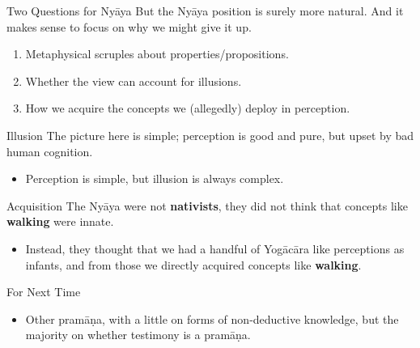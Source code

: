\documentclass[
  17pt,
  letterpaper,
  ignorenonframetext,
  aspectratio=169,
]{beamer}
\providecommand{\tightlist}{%
  \setlength{\itemsep}{0pt}\setlength{\parskip}{0pt}}\usepackage{longtable,booktabs,array}
\begin{document}
\begin{frame}{Two Questions for Nyāya}
\protect\hypertarget{two-questions-for-nyux101ya}{}
But the Nyāya position is surely more natural. And it makes sense to
focus on why we might give it up.

\begin{enumerate}[<+->]
\tightlist
\item
  Metaphysical scruples about properties/propositions.
\item
  Whether the view can account for illusions.
\item
  How we acquire the concepts we (allegedly) deploy in perception.
\end{enumerate}
\end{frame}

\begin{frame}{Illusion}
\protect\hypertarget{illusion}{}
The picture here is simple; perception is good and pure, but upset by
bad human cognition.

\begin{itemize}[<+->]
\tightlist
\item
  Perception is simple, but illusion is always complex.
\end{itemize}
\end{frame}

\begin{frame}{Acquisition}
\protect\hypertarget{acquisition}{}
The Nyāya were not \textbf{nativists}, they did not think that concepts
like \textbf{walking} were innate.

\begin{itemize}[<+->]
\tightlist
\item
  Instead, they thought that we had a handful of Yogācāra like
  perceptions as infants, and from those we directly acquired concepts
  like \textbf{walking}.
\end{itemize}
\end{frame}

\begin{frame}{For Next Time}
\protect\hypertarget{for-next-time}{}
\begin{itemize}[<+->]
\tightlist
\item
  Other pramāṇa, with a little on forms of non-deductive knowledge, but
  the majority on whether testimony is a pramāṇa.
\end{itemize}
\end{frame}
\end{document}
